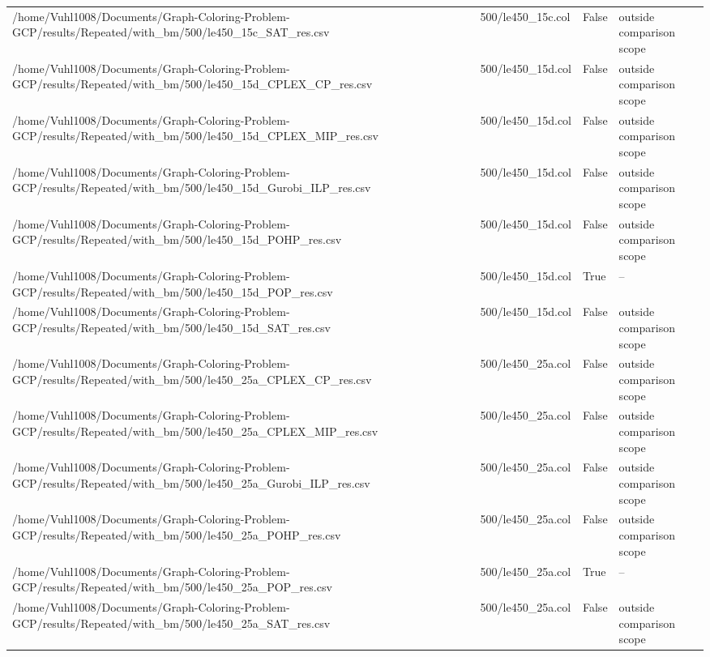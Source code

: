 \begin{table}[htbp]
\begin{tabular}{llll}
/home/Vuhl1008/Documents/Graph-Coloring-Problem-GCP/results/Repeated/with\_bm/500/le450\_15c\_SAT\_res.csv & 500/le450\_15c.col & False & outside comparison scope \\
/home/Vuhl1008/Documents/Graph-Coloring-Problem-GCP/results/Repeated/with\_bm/500/le450\_15d\_CPLEX\_CP\_res.csv & 500/le450\_15d.col & False & outside comparison scope \\
/home/Vuhl1008/Documents/Graph-Coloring-Problem-GCP/results/Repeated/with\_bm/500/le450\_15d\_CPLEX\_MIP\_res.csv & 500/le450\_15d.col & False & outside comparison scope \\
/home/Vuhl1008/Documents/Graph-Coloring-Problem-GCP/results/Repeated/with\_bm/500/le450\_15d\_Gurobi\_ILP\_res.csv & 500/le450\_15d.col & False & outside comparison scope \\
/home/Vuhl1008/Documents/Graph-Coloring-Problem-GCP/results/Repeated/with\_bm/500/le450\_15d\_POHP\_res.csv & 500/le450\_15d.col & False & outside comparison scope \\
/home/Vuhl1008/Documents/Graph-Coloring-Problem-GCP/results/Repeated/with\_bm/500/le450\_15d\_POP\_res.csv & 500/le450\_15d.col & True & -- \\
/home/Vuhl1008/Documents/Graph-Coloring-Problem-GCP/results/Repeated/with\_bm/500/le450\_15d\_SAT\_res.csv & 500/le450\_15d.col & False & outside comparison scope \\
/home/Vuhl1008/Documents/Graph-Coloring-Problem-GCP/results/Repeated/with\_bm/500/le450\_25a\_CPLEX\_CP\_res.csv & 500/le450\_25a.col & False & outside comparison scope \\
/home/Vuhl1008/Documents/Graph-Coloring-Problem-GCP/results/Repeated/with\_bm/500/le450\_25a\_CPLEX\_MIP\_res.csv & 500/le450\_25a.col & False & outside comparison scope \\
/home/Vuhl1008/Documents/Graph-Coloring-Problem-GCP/results/Repeated/with\_bm/500/le450\_25a\_Gurobi\_ILP\_res.csv & 500/le450\_25a.col & False & outside comparison scope \\
/home/Vuhl1008/Documents/Graph-Coloring-Problem-GCP/results/Repeated/with\_bm/500/le450\_25a\_POHP\_res.csv & 500/le450\_25a.col & False & outside comparison scope \\
/home/Vuhl1008/Documents/Graph-Coloring-Problem-GCP/results/Repeated/with\_bm/500/le450\_25a\_POP\_res.csv & 500/le450\_25a.col & True & -- \\
/home/Vuhl1008/Documents/Graph-Coloring-Problem-GCP/results/Repeated/with\_bm/500/le450\_25a\_SAT\_res.csv & 500/le450\_25a.col & False & outside comparison scope \\

\end{tabular}
\end{table}
